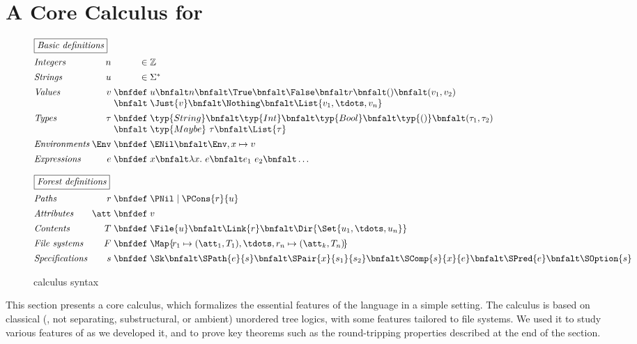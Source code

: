 \section{A Core Calculus for \forest{}}
\label{sec:theory}

\begin{figure}
\[
\begin{array}{@{}l@{\;}r@{\;}r@{\;}l@{}}
\multicolumn{4}{@{}l}{\fbox{\textit{Basic definitions}}}\\[1.5ex]
\textit{Integers}     & n    & \in & \mathbb{Z}\\[1ex]
\textit{Strings}      & u    & \in & \Sigma^{\ast}\\[1ex]
\textit{Values}       & v    & \bnfdef & u \bnfalt n \bnfalt \True \bnfalt \False \bnfalt r \bnfalt () \bnfalt (v_1,v_2)\\
                      &      & \bnfalt &\Just{v} \bnfalt \Nothing \bnfalt \List{v_1,\tdots,v_n}\\[1ex]
\textit{Types}        & \tau & \bnfdef & \typ{String} \bnfalt \typ{Int} \bnfalt \typ{Bool} \bnfalt \typ{()} \bnfalt (\tau_1,\tau_2) \\
                      &      & \bnfalt & \typ{Maybe}~\tau \bnfalt \List{\tau}\\[1ex]
\textit{Environments} & \Env & \bnfdef & \ENil \bnfalt \Env,x\mapsto v\\[1ex]
\textit{Expressions}  & e    & \bnfdef & x \bnfalt \lambda x.~e \bnfalt e_1~e_2 \bnfalt \dots \\[2.5ex]
%
\multicolumn{4}{@{}l}{\fbox{\textit{Forest definitions}}}\\[1.5ex]
\textit{Paths}          & r    & \bnfdef & \PNil \mid \PCons{r}{u}\\[1ex]
\textit{Attributes}     & \att & \bnfdef & v\\[1ex]
\textit{Contents}       & T    & \bnfdef & \File{u} \bnfalt \Link{r} \bnfalt \Dir{ \Set{u_1,\tdots,u_n} }\\[1ex]
\textit{File systems}   & F    & \bnfdef & \Map{ \! r_1 \mapsto (\att_1,T_1), \tdots, r_n \mapsto (\att_k,T_n) \! }\\[1ex]
\textit{Specifications} & s    & \bnfdef & \Sk \bnfalt \SPath{e}{s} \bnfalt \SPair{x}{s_1}{s_2} \bnfalt \SComp{s}{x}{e} \bnfalt \SPred{e} \bnfalt \SOption{s}
\end{array}
\]
\caption{\forest{} calculus syntax}
\label{fig:csyntax}
\end{figure}

This section presents a core \forest{} calculus, which formalizes the
essential features of the language in a simple setting. The calculus
is based on classical (\ie{}, not separating, substructural, or
ambient) unordered tree logics, with some features tailored to file
systems. We used it to study various features of \forest{} as we
developed it, and to prove key theorems such as the round-tripping
properties described at the end of the section.


